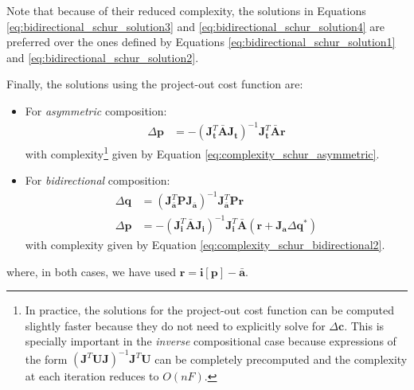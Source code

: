 Note that because of their reduced complexity, the solutions in Equations \ref{eq:bidirectional_schur_solution3} and \ref{eq:bidirectional_schur_solution4} are preferred over the ones defined by Equations \ref{eq:bidirectional_schur_solution1} and \ref{eq:bidirectional_schur_solution2}.

Finally, the solutions using the project-out cost function are:
\begin{itemize}
	\item For \emph{asymmetric} composition:
	\begin{equation}
	    \begin{aligned}
	        \Delta \mathbf{p} & = -\left( \mathbf{J}_{\mathbf{t}}^T\bar{\mathbf{A}}\mathbf{J}_{\mathbf{t}} \right)^{-1} \mathbf{J}_{\mathbf{t}}^T\bar{\mathbf{A}}\mathbf{r}
	    \label{eq:asymmetric_schur_po_solution}
	    \end{aligned}
	\end{equation}
	with complexity\footnote{\label{foot:ic}In practice, the solutions for the project-out cost function can be computed slightly faster because they do not need to explicitly solve for $\Delta\mathbf{c}$. This is specially important in the \emph{inverse} compositional case because expressions of the form $(\mathbf{J}^T\mathbf{U}\mathbf{J})^{-1}\mathbf{J}^T\mathbf{U}$ can be completely precomputed and the complexity at each iteration reduces to $O(nF)$.} given by Equation \ref{eq:complexity_schur_asymmetric}.

	\item For \emph{bidirectional} composition:
	\begin{equation}
	    \begin{aligned}
	        \Delta \mathbf{q} & = \left( \mathbf{J}_{\bar{\mathbf{a}}}^T\mathbf{P}\mathbf{J}_{\bar{\mathbf{a}}} \right)^{-1} \mathbf{J}_{\bar{\mathbf{a}}}^T\mathbf{P}\mathbf{r}
	        \\
	        \Delta \mathbf{p} & = -\left( \mathbf{J}_{\mathbf{i}}^T\bar{\mathbf{A}}\mathbf{J}_{\mathbf{i}} \right)^{-1} \mathbf{J}_\mathbf{i}^T \bar{\mathbf{A}} \left( \mathbf{r} + \mathbf{J}_{\mathbf{a}} \Delta\mathbf{q}^* \right)
	    \label{eq:bidirectional_schur_po_solution}
	    \end{aligned}
	\end{equation}
	with complexity given by Equation \ref{eq:complexity_schur_bidirectional2}.
\end{itemize}
where, in both cases, we have used $\mathbf{r} = \mathbf{i}[\mathbf{p}] - \bar{\mathbf{a}}$.


